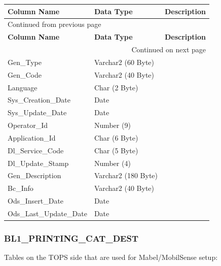 \documentclass[12pt,twoside]{article}
\begin{document}
\begin{longtable}{l|l|l}
\hline
\textbf{Column Name} & \textbf{Data Type} & \textbf{Description}\\
\hline
\endfirsthead
\multicolumn{3}{l}{Continued from previous page} \\
\hline

\textbf{Column Name} & \textbf{Data Type} & \textbf{Description} \\

\hline
\endhead
\hline\multicolumn{3}{r}{Continued on next page} \\
\endfoot
\endlastfoot
\hline
Gen\_Type & Varchar2 (60 Byte) & \\
Gen\_Code & Varchar2 (40 Byte) & \\
Language & Char (2 Byte) & \\
Sys\_Creation\_Date & Date & \\
Sys\_Update\_Date & Date & \\
Operator\_Id & Number (9) & \\
Application\_Id & Char (6 Byte) & \\
Dl\_Service\_Code & Char (5 Byte) & \\
Dl\_Update\_Stamp & Number (4) & \\
Gen\_Description & Varchar2 (180 Byte) & \\
Bc\_Info & Varchar2 (40 Byte) & \\
Ods\_Insert\_Date & Date & \\
Ods\_Last\_Update\_Date & Date & \\
\hline
\end{longtable}
\normalsize

\subsubsection{BL1\_PRINTING\_CAT\_DEST}
\label{sec:orgheadline150}
Tables on the TOPS side that are used for Mabel/MobilSense setup:
\footnotesize
\end{document}
